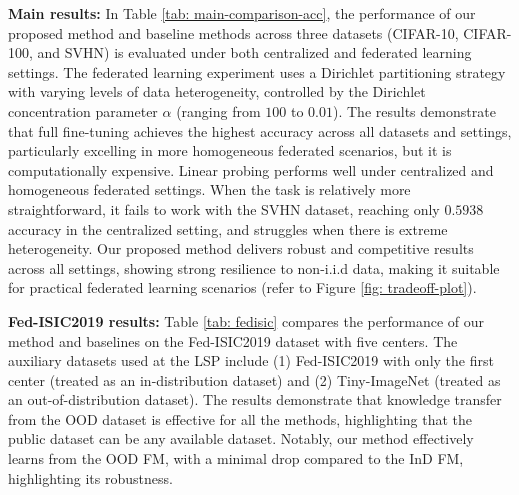 \textbf{Main results: } In Table \ref{tab: main-comparison-acc}, the performance of our proposed method and baseline methods across three datasets (CIFAR-10, CIFAR-100, and SVHN) is evaluated under both centralized and federated learning settings. The federated learning experiment uses a Dirichlet partitioning strategy with varying levels of data heterogeneity, controlled by the Dirichlet concentration parameter $\alpha$ (ranging from $100$ to $0.01$). The results demonstrate that full fine-tuning achieves the highest accuracy across all datasets and settings, particularly excelling in more homogeneous federated scenarios, but it is computationally expensive. Linear probing performs well under centralized and homogeneous federated settings. When the task is relatively more straightforward, it fails to work with the SVHN dataset, reaching only $0.5938$ accuracy in the centralized setting, and struggles when there is extreme heterogeneity. Our proposed method delivers robust and competitive results across all settings, showing strong resilience to non-i.i.d data, making it suitable for practical federated learning scenarios (refer to Figure \ref{fig: tradeoff-plot}). 

\noindent\textbf{Fed-ISIC2019 results: } Table \ref{tab: fedisic} compares the performance of our method and baselines on the Fed-ISIC2019 dataset with five centers. The auxiliary datasets used at the LSP include (1) Fed-ISIC2019 with only the first center (treated as an in-distribution dataset) and (2) Tiny-ImageNet (treated as an out-of-distribution dataset). The results demonstrate that knowledge transfer from the OOD dataset is effective for all the methods, highlighting that the public dataset can be any available dataset. Notably, our method effectively learns from the OOD FM, with a minimal drop compared to the InD FM, highlighting its robustness. 

\begin{table}[th]
    \centering
    \caption{Scalability analysis of the proposed method to baseline approaches on the CIFAR-10, with varying number of clients $K \in \{10, 20, 50\}$ under a Dirichlet concentration parameter of $1.0$ for data partitioning. $N/A$ $-$ one GPU is insufficient to run the experiment. } 
    \label{tab: number-of-participants}
    \vspace{-0.5em}
\end{table}


